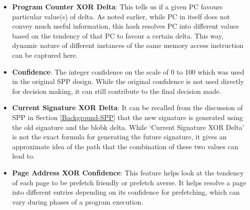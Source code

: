 \begin{itemize}
\item \textbf{Program Counter XOR Delta}: This tells us if a given PC
  favours particular value(s) of delta.  As noted earlier, while PC in
  itself does not convey much useful information, this hash resolves PC into
  different values based on the tendency of that PC to favour a
  certain delta.  This way, dynamic nature of different instances of
  the same memory access instruction can be captured here.

\item \textbf{Confidence}: The integer confidence on the scale of 0 to
  100 which was used in the original SPP design.  While the original
  confidence is not used directly for decision making, it can still
  contribute to the final decision made.

\item \textbf{Current Signature XOR Delta}: It can be recalled from
  the discussion of SPP in Section \ref{Background-SPP} that the new signature is
  generated using the old signature and the blobk delta.  While
  `Current Signature XOR Delta' is not the exact formula for
  generating the future signature, it gives an approximate idea of the
  path that the combination of these two values can lead to.

\item \textbf{Page Address XOR Confidence}: This feature helps look at the 
tendency of each page to be prefetch friendly or prefetch averse. It 
helps resolve a page into different entries depending on its confidence 
for prefetching, which can vary during phases of a program execution.


\end{itemize} 

